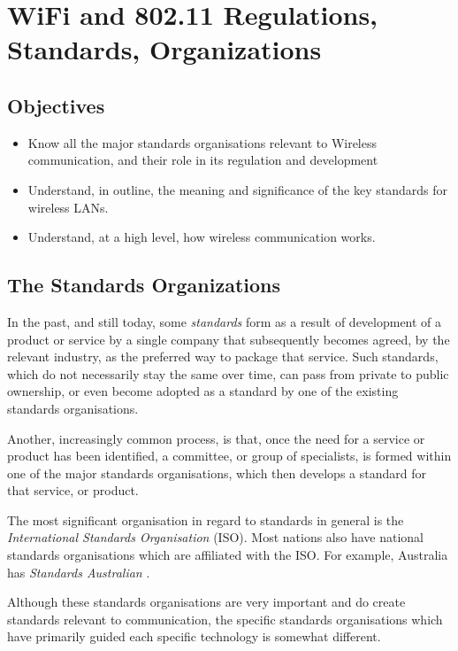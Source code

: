 \chapter{WiFi and 802.11 Regulations, Standards, Organizations}\label{wifi}

\minitoc 


\section*{Objectives}
\begin{itemize}

\item Know all the major standards organisations relevant to Wireless communication, and
	their role in its regulation and development

\item Understand, in outline, the meaning and significance of the key standards
	for wireless LANs.

\item Understand, at a high level, how wireless communication works.

\end{itemize}

\section{The Standards Organizations}

In the past, and still today, some {\em standards} form as a result of
development of a product or service by a single company that subsequently
becomes agreed, by the relevant industry, as the preferred way to package
that service. Such standards, which do not necessarily stay the same
over time, can pass from private to public ownership, or even
become adopted as a standard by one of the existing standards organisations.

Another, increasingly common process, is that, once the need for a service
or product has been identified, a committee, or group of specialists,
is formed within one of the major standards organisations, which then
develops a standard for that service, or product.

The most significant organisation in regard to standards in general
is the {\em International Standards Organisation} (ISO).
Most nations also have national standards organisations which are
affiliated with the ISO. For example, Australia has {\em Standards Australian}
\cite{SA}. 

Although these standards organisations are very important and 
do create standards relevant to communication, the specific standards
organisations which have primarily guided each specific technology is
somewhat different.

